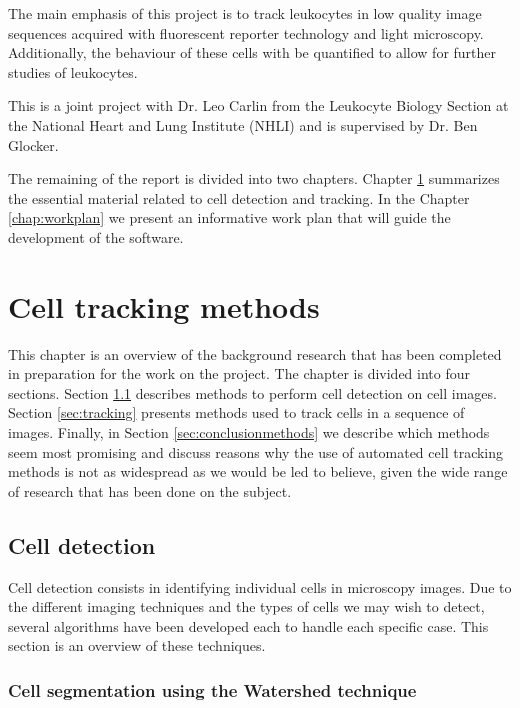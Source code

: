 \documentclass[12pt,a4paper,openany]{book}
\begin{document}
The main emphasis of this project is to track leukocytes in low quality image sequences acquired with fluorescent reporter technology and light microscopy. Additionally, the behaviour of these cells with be quantified to allow for further studies of leukocytes.

This is a joint project with Dr. Leo Carlin from the Leukocyte Biology Section at the National Heart and Lung Institute (NHLI) and is supervised by Dr. Ben Glocker.

The remaining of the report is divided into two chapters. Chapter \ref{chap:methodoverview} summarizes the essential material related to cell detection and tracking. In the Chapter \ref{chap:workplan} we present an informative work plan that will guide the development of the software. 



\chapter{Cell tracking methods}
\label{chap:methodoverview}

This chapter is an overview of the background research that has been completed in preparation for the work on the project. The chapter is divided into four sections. Section \ref{sec:detection} describes methods to perform cell detection on cell images. Section \ref{sec:tracking} presents methods used to track cells in a sequence of images. Finally, in Section \ref{sec:conclusionmethods} we describe which methods seem most promising and discuss reasons why the use of automated cell tracking methods is not as widespread as we would be led to believe, given the wide range of research that has been done on the subject.


\section{Cell detection}
\label{sec:detection}

Cell detection consists in identifying individual cells in microscopy images. Due to the different imaging techniques and the types of cells we may wish to detect, several algorithms have been developed each to handle each specific case. This section is an overview of these techniques.

\subsection{Cell segmentation using the Watershed technique}
\end{document}
